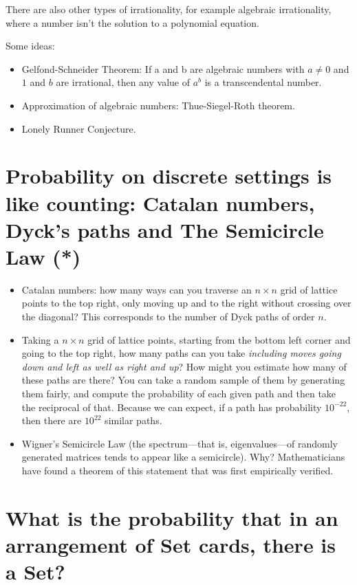 \documentclass{article}
\begin{document}
        There are also other types of irrationality, for example algebraic irrationality, where a number isn't the solution to a polynomial equation.

        Some ideas:

        \begin{itemize}
            \item Gelfond-Schneider Theorem: If a and b are algebraic numbers with $a \neq 0$ and $1$ and $b$ are irrational, then any value of $a^b$ is a transcendental number.
            \item Approximation of algebraic numbers: Thue-Siegel-Roth theorem.
            \item Lonely Runner Conjecture.
        \end{itemize}
        
\section{Probability on discrete settings is like counting: Catalan numbers, Dyck's paths and The Semicircle Law (*) }
    \begin{itemize}
    \item Catalan numbers: how many ways can you traverse an $n \times n$ grid of lattice points to the top right, only moving up and to the right without crossing over the diagonal? This corresponds to the number of Dyck paths of order $n$.
    \item Taking a $n \times n$ grid of lattice points, starting from the bottom left corner and going to the top right, how many paths can you take \textit{including moves going down and left as well as right and up}? How might you estimate how many of these paths are there? You can take a random sample of them by generating them fairly, and compute the probability of each given path and then take the reciprocal of that. Because we can expect, if a path has probability $10^{-22}$, then there are $10^{22}$ similar paths. 
    \item Wigner's Semicircle Law (the spectrum---that is, eigenvalues---of randomly generated matrices tends to appear like a semicircle). Why? Mathematicians have found a theorem of this statement that was first empirically verified.

    \end{itemize}

\section{What is the probability that in an arrangement of Set cards, there is a Set?}
\end{document}
